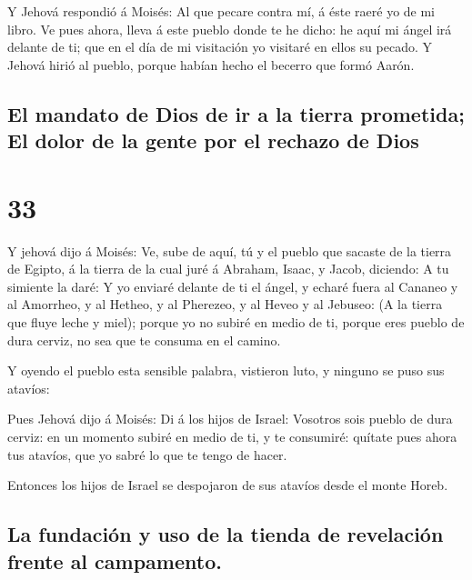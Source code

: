  Y Jehová respondió á Moisés: Al que pecare contra mí, á
éste raeré yo de mi libro.  Ve pues ahora, lleva á este
pueblo donde te he dicho: he aquí mi ángel irá delante de ti; que en el
día de mi visitación yo visitaré en ellos su pecado.  Y
Jehová hirió al pueblo, porque habían hecho el becerro que formó Aarón.

\hypertarget{el-mandato-de-dios-de-ir-a-la-tierra-prometida-el-dolor-de-la-gente-por-el-rechazo-de-dios}{%
\subsection{El mandato de Dios de ir a la tierra prometida; El dolor de
la gente por el rechazo de
Dios}\label{el-mandato-de-dios-de-ir-a-la-tierra-prometida-el-dolor-de-la-gente-por-el-rechazo-de-dios}}

\hypertarget{section-32}{%
\section{33}\label{section-32}}

 Y jehová dijo á Moisés: Ve, sube de aquí, tú y el pueblo
que sacaste de la tierra de Egipto, á la tierra de la cual juré á
Abraham, Isaac, y Jacob, diciendo: A tu simiente la daré:  Y
yo enviaré delante de ti el ángel, y echaré fuera al Cananeo y al
Amorrheo, y al Hetheo, y al Pherezeo, y al Heveo y al Jebuseo:
 (A la tierra que fluye leche y miel); porque yo no subiré
en medio de ti, porque eres pueblo de dura cerviz, no sea que te consuma
en el camino.

 Y oyendo el pueblo esta sensible palabra, vistieron luto, y
ninguno se puso sus atavíos:

 Pues Jehová dijo á Moisés: Di á los hijos de Israel:
Vosotros sois pueblo de dura cerviz: en un momento subiré en medio de
ti, y te consumiré: quítate pues ahora tus atavíos, que yo sabré lo que
te tengo de hacer.

 Entonces los hijos de Israel se despojaron de sus atavíos
desde el monte Horeb.

\hypertarget{la-fundaciuxf3n-y-uso-de-la-tienda-de-revelaciuxf3n-frente-al-campamento.}{%
\subsection{La fundación y uso de la tienda de revelación frente al
campamento.}\label{la-fundaciuxf3n-y-uso-de-la-tienda-de-revelaciuxf3n-frente-al-campamento.}}

